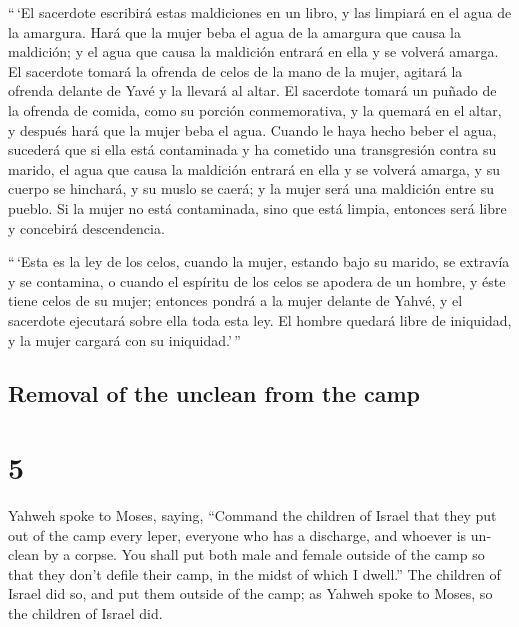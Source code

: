 \begin{paracol}{2}
 ``\,`El sacerdote escribirá estas maldiciones en un
libro, y las limpiará en el agua de la amargura.  Hará
que la mujer beba el agua de la amargura que causa la maldición; y el
agua que causa la maldición entrará en ella y se volverá amarga.
 El sacerdote tomará la ofrenda de celos de la mano de la
mujer, agitará la ofrenda delante de Yavé y la llevará al altar.
 El sacerdote tomará un puñado de la ofrenda de comida,
como su porción conmemorativa, y la quemará en el altar, y después hará
que la mujer beba el agua.  Cuando le haya hecho beber el
agua, sucederá que si ella está contaminada y ha cometido una
transgresión contra su marido, el agua que causa la maldición entrará en
ella y se volverá amarga, y su cuerpo se hinchará, y su muslo se caerá;
y la mujer será una maldición entre su pueblo.  Si la
mujer no está contaminada, sino que está limpia, entonces será libre y
concebirá descendencia.

 ``\,`Esta es la ley de los celos, cuando la mujer,
estando bajo su marido, se extravía y se contamina,  o
cuando el espíritu de los celos se apodera de un hombre, y éste tiene
celos de su mujer; entonces pondrá a la mujer delante de Yahvé, y el
sacerdote ejecutará sobre ella toda esta ley.  El hombre
quedará libre de iniquidad, y la mujer cargará con su iniquidad.'\,''

\switchcolumn
\begin{otherlanguage}{english}

\hypertarget{removal-of-the-unclean-from-the-camp}{%
\subsection{Removal of the unclean from the
camp}\label{removal-of-the-unclean-from-the-camp}}

\hypertarget{section-9}{%
\section{5}\label{section-9}}

 Yahweh spoke to Moses, saying,  ``Command
the children of Israel that they put out of the camp every leper,
everyone who has a discharge, and whoever is unclean by a corpse.
 You shall put both male and female outside of the camp so
that they don't defile their camp, in the midst of which I dwell.''
 The children of Israel did so, and put them outside of
the camp; as Yahweh spoke to Moses, so the children of Israel did.


\end{otherlanguage}
\end{paracol}
